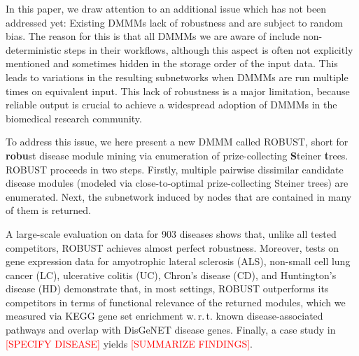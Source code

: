 \documentclass{bioinfo}
\makeatletter
\newcommand{\wrt}{w.\,r.\,t.\@\xspace}
\makeatother
\begin{document}
In this paper, we draw attention to an additional issue which has not been addressed yet: Existing DMMMs lack of robustness and are subject to random bias. The reason for this is that all DMMMs we are aware of include non-deterministic steps in their workflows, although this aspect is often not explicitly mentioned and sometimes hidden in the storage order of the input data. This leads to variations in the resulting subnetworks when DMMMs are run multiple times on equivalent input. This lack of robustness is a major limitation, because reliable output is crucial to achieve a widespread adoption of DMMMs in the biomedical research community. 

To address this issue, we here present a new DMMM called ROBUST, short for \textbf{robu}st disease module mining via enumeration of prize-collecting \textbf{S}teiner \textbf{t}rees. ROBUST proceeds in two steps. Firstly, multiple pairwise dissimilar candidate disease modules (modeled via close-to-optimal prize-collecting Steiner trees) are enumerated. Next, the subnetwork induced by nodes that are contained in many of them is returned.

A large-scale evaluation on data for \num{903} diseases shows that, unlike all tested competitors, ROBUST achieves almost perfect robustness. Moreover, tests on gene expression data for amyotrophic lateral sclerosis (ALS), non-small cell lung cancer (LC), ulcerative colitis (UC), Chron’s disease (CD), and Huntington’s disease (HD) demonstrate that, in most settings, ROBUST outperforms its competitors in terms of functional relevance of the returned modules, which we measured via KEGG \citep{kegg_kanehisa2016} gene set enrichment \wrt known disease-associated pathways and overlap with DisGeNET \citep{disgenet_pinero2020} disease genes. Finally, a case study in \textcolor{red}{[SPECIFY DISEASE]} yields \textcolor{red}{[SUMMARIZE FINDINGS]}.
\end{document}
